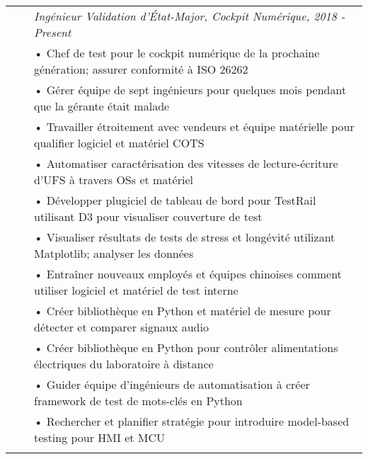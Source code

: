 \documentclass{minimal}
\begin{document}
\begin{tabular}{ p{1.5cm} p{1cm} p{16cm} }
& & \textit{Ingénieur Validation d'État-Major, Cockpit Numérique, 2018 - Present}\\
& & • Chef de test pour le cockpit numérique de la prochaine génération; assurer conformité à ISO 26262\\
& & • Gérer équipe de sept ingénieurs pour quelques mois pendant que la gérante était malade\\
& & • Travailler étroitement avec vendeurs et équipe matérielle pour qualifier logiciel et matériel COTS\\
& & • Automatiser caractérisation des vitesses de lecture-écriture d'UFS à travers OSs et matériel\\
& & • Développer plugiciel de tableau de bord pour TestRail utilisant D3 pour visualiser couverture de test\\
& & • Visualiser résultats de tests de stress et longévité utilizant Matplotlib; analyser les données\\
& & • Entraîner nouveaux employés et équipes chinoises comment utiliser logiciel et matériel de test interne\\
& & • Créer bibliothèque en Python et matériel de mesure pour détecter et comparer signaux audio\\
& & • Créer bibliothèque en Python pour contrôler alimentations électriques du laboratoire à distance\\ 
& & • Guider équipe d'ingénieurs de automatisation à créer framework de test de mots-clés en Python\\
& & • Rechercher et planifier stratégie pour introduire model-based testing pour HMI et MCU\\
& & \\
\end{tabular}
\end{document}
